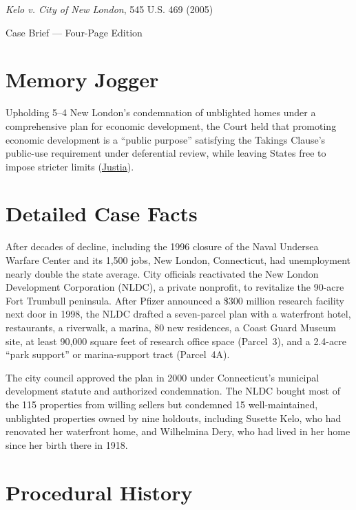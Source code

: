 \documentclass[12pt]{article}
\begin{document}
\begin{center}
{\LARGE \textit{Kelo v. City of New London}, 545 U.S. 469 (2005)\par}
\vspace{0.8em}
{\large Case Brief --- Four-Page Edition\par}
\end{center}
\vspace{1em}

\section{Memory Jogger}

Upholding 5--4 New London's condemnation of unblighted homes under a comprehensive plan for economic development, the Court held that promoting economic development is a ``public purpose'' satisfying the Takings Clause's public-use requirement under deferential review, while leaving States free to impose stricter limits (\href{https://supreme.justia.com/cases/federal/us/545/469/}{Justia}).

\section{Detailed Case Facts}

After decades of decline, including the 1996 closure of the Naval Undersea Warfare Center and its 1,500 jobs, New London, Connecticut, had unemployment nearly double the state average. City officials reactivated the New London Development Corporation (NLDC), a private nonprofit, to revitalize the 90-acre Fort Trumbull peninsula. After Pfizer announced a \$300 million research facility next door in 1998, the NLDC drafted a seven-parcel plan with a waterfront hotel, restaurants, a riverwalk, a marina, 80 new residences, a Coast Guard Museum site, at least 90,000 square feet of research office space (Parcel~3), and a 2.4-acre ``park support'' or marina-support tract (Parcel~4A).

The city council approved the plan in 2000 under Connecticut's municipal development statute and authorized condemnation. The NLDC bought most of the 115 properties from willing sellers but condemned 15 well-maintained, unblighted properties owned by nine holdouts, including Susette Kelo, who had renovated her waterfront home, and Wilhelmina Dery, who had lived in her home since her birth there in 1918.

\section{Procedural History}
\end{document}
